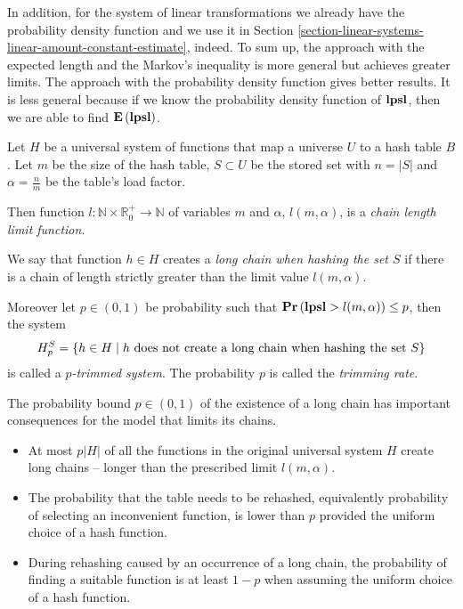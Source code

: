 In addition, for the system of linear transformations we already have the probability density function and  we use it in Section \ref{section-linear-systems-linear-amount-constant-estimate}, indeed. To sum up, the approach with the expected length and the Markov's inequality is more general but achieves greater limits. The approach with the probability density function gives better results. It is less general because if we know the probability density function of $\mathbf{lpsl}$, then we are able to find $\mathbf{E}\left(\mathbf{lpsl}\right)$.

\begin{definition}
Let $H$ be a universal system of functions that map a universe $U$ to a hash table $B$. Let $m$ be the size of the hash table, $S \subset U$ be the stored set with $n = |S|$ and $\alpha = \frac{n}{m}$ be the table's load factor. 

Then function $l: \mathbb{N} \times \mathbb{R}_{0}^{+} \rightarrow \mathbb{N}$ of variables $m$ and $\alpha$, $l(m, \alpha)$, is a \emph{chain length limit function}. 

We say that function $h \in H$ creates a \emph{long chain when hashing the set $S$} if there is a chain of length strictly greater than the limit value $l(m, \alpha)$.

Moreover let $p \in (0, 1)$ be probability such that $\mathbf{Pr}\left(\mathbf{lpsl} > l(m, \alpha)\right) \leq p$, then the system \[ H_p^S = \{ h \in H \mid h \text{ does not create a long chain when hashing the set $S$} \} \] is called a \emph{$p$-trimmed system}. The probability $p$ is called the \emph{trimming rate}.
\end{definition}

The probability bound $p \in (0, 1)$ of the existence of a long chain has important consequences for the model that limits its chains.
\begin{itemize}
\item At most $p|H|$ of all the functions in the original universal system $H$ create long chains -- longer than the prescribed limit $l(m, \alpha)$. 
\item The probability that the table needs to be rehashed, equivalently probability of selecting an inconvenient function, is lower than $p$ provided the uniform choice of a hash function.
\item During rehashing caused by an occurrence of a long chain, the probability of finding a suitable function is at least $1 - p$ when assuming the uniform choice of a hash function.
\end{itemize}

